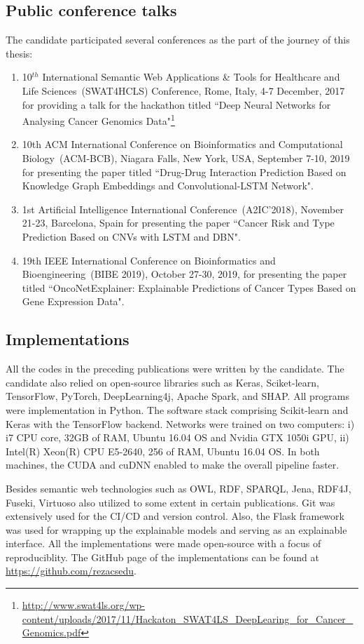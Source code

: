 \subsection{Public conference talks}
The candidate participated several conferences as the part of the journey of this thesis: 
\begin{enumerate}[noitemsep]
    \item 10$^{th}$ International Semantic Web Applications \& Tools for Healthcare and Life Sciences~(SWAT4HCLS) Conference, Rome, Italy, 4-7 December, 2017 for providing a talk for the hackathon titled ``Deep Neural Networks for Analysing Cancer Genomics Data"\footnote{\url{http://www.swat4ls.org/wp-content/uploads/2017/11/Hackaton_SWAT4LS_DeepLearing_for_Cancer_Genomics.pdf}}
	\item 10th ACM International Conference on Bioinformatics and Computational Biology~(ACM-BCB), Niagara Falls, New York, USA, September 7-10, 2019 for presenting the paper titled ``Drug-Drug Interaction Prediction Based on Knowledge Graph Embeddings and Convolutional-LSTM Network".
	\item 1st Artificial Intelligence International Conference~(A2IC'2018), November 21-23, Barcelona, Spain for presenting the paper ``Cancer Risk and Type Prediction Based on CNVs with LSTM and DBN". 
	\item 19th IEEE International Conference on Bioinformatics and Bioengineering~(BIBE 2019), October 27-30, 2019, for presenting the paper titled ``OncoNetExplainer: Explainable Predictions of Cancer Types Based on Gene Expression Data".
\end{enumerate}

\subsection{Implementations}
All the codes in the preceding publications were written by the candidate. The candidate also relied on open-source libraries such as Keras, Sciket-learn, TensorFlow, PyTorch, DeepLearning4j, Apache Spark, and SHAP. All programs were implementation in Python. The software stack comprising Scikit-learn and Keras with the TensorFlow backend. Networks were trained on two computers: i) i7 CPU core, 32GB of RAM, Ubuntu 16.04 OS and Nvidia GTX 1050i GPU, ii) Intel(R) Xeon(R) CPU E5-2640, 256 of RAM, Ubuntu 16.04 OS. In both machines, the CUDA and cuDNN enabled to make the overall pipeline faster. 

\hspace*{3.5mm} Besides semantic web technologies such as OWL, RDF, SPARQL, Jena, RDF4J, Fuseki, Virtuoso also utilized to some extent in certain publications. Git was extensively used for the CI/CD and version control. Also, the Flask framework was used for wrapping up the explainable models and serving as an explainable interface. All the implementations were made open-source with a focus of reproduciblity. The GitHub page of the implementations can be found at \url{https://github.com/rezacsedu}.

